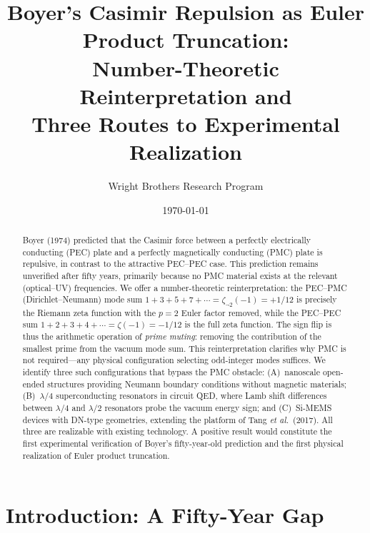\documentclass[aps,prd,twocolumn,superscriptaddress,nofootinbib]{revtex4-2}
\begin{document}
\title{Boyer's Casimir Repulsion as Euler Product Truncation:\\
Number-Theoretic Reinterpretation and\\
Three Routes to Experimental Realization}

\author{Wright Brothers Research Program}

\date{\today}

\begin{abstract}
Boyer (1974) predicted that the Casimir force between a perfectly
electrically conducting (PEC) plate and a perfectly magnetically
conducting (PMC) plate is repulsive, in contrast to the attractive
PEC--PEC case.  This prediction remains unverified after fifty
years, primarily because no PMC material exists at the relevant
(optical--UV) frequencies.  We offer a number-theoretic
reinterpretation: the PEC--PMC (Dirichlet--Neumann) mode sum
$1+3+5+7+\cdots=\zeta_{\neg 2}(-1)=+1/12$ is precisely the
Riemann zeta function with the $p{=}2$ Euler factor removed,
while the PEC--PEC sum $1+2+3+4+\cdots=\zeta(-1)=-1/12$ is the
full zeta function.  The sign flip is thus the arithmetic operation
of \emph{prime muting}: removing the contribution of the smallest
prime from the vacuum mode sum.  This reinterpretation clarifies why
PMC is not required---any physical configuration selecting odd-integer
modes suffices.  We identify three such configurations that bypass
the PMC obstacle: (A)~nanoscale open-ended structures providing
Neumann boundary conditions without magnetic materials;
(B)~$\lambda/4$ superconducting resonators in circuit QED, where
Lamb shift differences between $\lambda/4$ and $\lambda/2$
resonators probe the vacuum energy sign; and (C)~Si-MEMS devices
with DN-type geometries, extending the platform of Tang \textit{et
al.}\ (2017).  All three are realizable with existing technology.
A positive result would constitute the first experimental
verification of Boyer's fifty-year-old prediction and the first
physical realization of Euler product truncation.
\end{abstract}

\maketitle

\section{Introduction: A Fifty-Year Gap}
\end{document}
